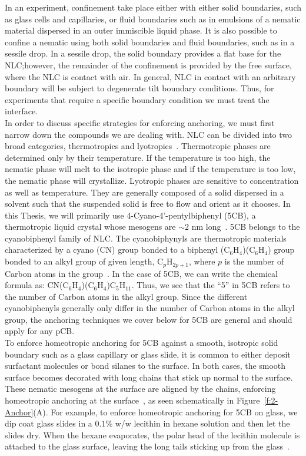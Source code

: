 In an experiment, confinement take place either with either solid boundaries, such as glass cells and capillaries, or fluid boundaries such as in emulsions of a nematic material dispersed in an outer immiscible liquid phase.
It is also possible to confine a nematic using both solid boundaries and fluid boundaries, such as in a sessile drop.
In a sessile drop, the solid boundary provides a flat base for the NLC;\@ however, the remainder of the confinement is provided by the free surface, where the NLC is contact with air.
In general, NLC in contact with an arbitrary boundary will be subject to degenerate tilt boundary conditions.
Thus, for experiments that require a specific boundary condition we must treat the interface.\\

In order to discuss specific strategies for enforcing anchoring, we must first narrow down the compounds we are dealing with.
NLC can be divided into two broad categories, thermotropics and lyotropics~\cite{RN33}.
Thermotropic phases are determined only by their temperature.
If the temperature is too high, the nematic phase will melt to the isotropic phase and if the temperature is too low, the nematic phase will crystallize.
Lyotropic phases are sensitive to concentration as well as temperature.
They are generally composed of a solid dispersed in a solvent such that the suspended solid is free to flow and orient as it chooses.
In this Thesis, we will primarily use 4-Cyano-4'-pentylbiphenyl (5CB), a thermotropic liquid crystal whose mesogens are $\sim 2$ nm long~\cite{RN33}.\@
5CB belongs to the cyanobiphenyl family of NLC.
The cyanobiphynyls are thermotropic materials characterized by a cyano (CN) group  bonded to a biphenyl (C$_6$H$_4$)(C$_6$H$_4$) group bonded to an alkyl group of given length, C$_p$H$_{2p+1}$, where $p$ is the number of Carbon atoms in the group~\cite{RN33}.
In the case of 5CB, we can write the chemical formula as: CN(C$_6$H$_4$)(C$_6$H$_4$)C$_5$H$_{11}$.
Thus, we see that the ``5'' in 5CB refers to the number of Carbon atoms in the alkyl group.
Since the different cyanobiphenyls generally only differ in the number of Carbon atoms in the alkyl group, the anchoring techniques we cover below for 5CB are general and should apply for any pCB. \\

To enforce homeotropic anchoring for 5CB against a smooth, isotropic solid boundary such as a glass capillary or glass slide, it is common to either deposit surfactant molecules or bond silanes to the surface.
In both cases, the smooth surface becomes decorated with long chains that stick up normal to the surface.
These nematic mesogens at the surface are aligned by the chains, enforcing homeotropic anchoring at the surface~\cite{RN33}, as seen schematically in Figure~\ref{f:2-Anchor}(A).
For example, to enforce homeotropic anchoring for 5CB on glass, we dip coat glass slides in a $0.1$\% w/w lecithin in hexane solution and then let the slides dry.
When the hexane evaporates, the polar head of the lecithin molecule is attached to the glass surface, leaving the long tails sticking up from the glass~\cite{RN140}.\\


